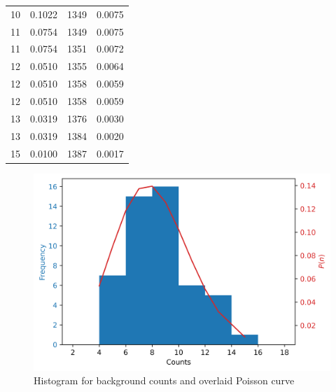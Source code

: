 \documentclass[%
 reprint,
nofootinbib,
 amsmath,amssymb,
 aps,
floatfix,
]{revtex4-2}
\begin{document}
\begin{table}[]
\begin{tabular}{@{}cccc@{}}
        10        & 0.1022  & 1349               & 0.0075   \\
        11        & 0.0754  & 1349               & 0.0075   \\
        11        & 0.0754  & 1351               & 0.0072   \\
        12        & 0.0510  & 1355               & 0.0064   \\
        12        & 0.0510  & 1358               & 0.0059   \\
        12        & 0.0510  & 1358               & 0.0059   \\
        13        & 0.0319  & 1376               & 0.0030   \\
        13        & 0.0319  & 1384               & 0.0020   \\
        15        & 0.0100  & 1387               & 0.0017   \\ \bottomrule
        \end{tabular}
        \end{table}
        \begin{figure}
            \centering
            \includegraphics[scale = 0.63]{Figures/plot-ncs-bg.png}
            \caption{Histogram for background counts and overlaid Poisson curve}
            \label{fig:ncs-bg}
        \end{figure}
\end{document}
